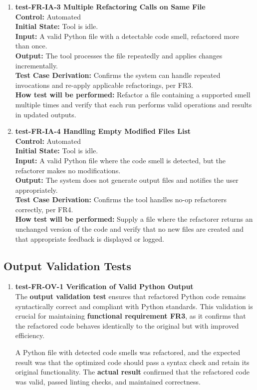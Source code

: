 \documentclass[12pt, titlepage]{article}
\begin{document}
\begin{enumerate}
  \item \textbf{test-FR-IA-3 Multiple Refactoring Calls on Same File} \\[2mm]
    \textbf{Control:} Automated \\
    \textbf{Initial State:} Tool is idle. \\
    \textbf{Input:} A valid Python file with a detectable code smell, refactored more than once. \\
    \textbf{Output:} The tool processes the file repeatedly and applies changes incrementally. \\
    \textbf{Test Case Derivation:} Confirms the system can handle repeated invocations and re-apply applicable refactorings, per FR3. \\
    \textbf{How test will be performed:} Refactor a file containing a supported smell multiple times and verify that each run performs valid operations and results in updated outputs.

  \item \textbf{test-FR-IA-4 Handling Empty Modified Files List} \\[2mm]
    \textbf{Control:} Automated \\
    \textbf{Initial State:} Tool is idle. \\
    \textbf{Input:} A valid Python file where the code smell is detected, but the refactorer makes no modifications. \\
    \textbf{Output:} The system does not generate output files and notifies the user appropriately. \\
    \textbf{Test Case Derivation:} Confirms the tool handles no-op refactorers correctly, per FR4. \\
    \textbf{How test will be performed:} Supply a file where the refactorer returns an unchanged version of the code and verify that no new files are created and that appropriate feedback is displayed or logged.
\end{enumerate}

\subsection{Output Validation Tests}
\begin{enumerate}
  \item \textbf{test-FR-OV-1 Verification of Valid Python Output} \\[2mm]
    The \textbf{output validation test} ensures that refactored
    Python code remains syntactically correct and compliant with
    Python standards. This validation is crucial for maintaining
    \textbf{functional requirement FR3}, as it confirms that the
    refactored code behaves identically to the original but with
    improved efficiency.

    A Python file with detected code smells was refactored, and the
    expected result was that the optimized code should pass a syntax
    check and retain its original functionality. The \textbf{actual
    result} confirmed that the refactored code was valid, passed
    linting checks, and maintained correctness.
\end{enumerate}
\end{document}
